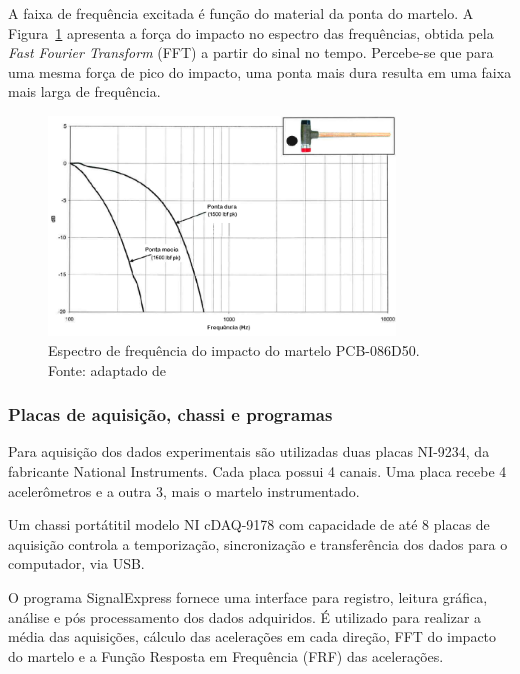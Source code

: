 A faixa de frequência excitada é função do material da ponta do martelo.
A Figura~\ref{fig::carta_badwidth} apresenta a força do impacto no espectro das
frequências, obtida pela \textit{Fast Fourier Transform} (FFT) a partir do sinal
no tempo.
Percebe-se que para uma mesma força de pico do impacto, uma ponta mais dura
resulta em uma faixa mais larga de frequência.

\begin{figure}[h!]
	\centering 
 	\includegraphics[width=0.82\textwidth]{figs/carta_badwidth}
 	\caption[Espectro de frequência do impacto do martelo PCB-086D50]{Espectro de
 	frequência do impacto do martelo PCB-086D50. \\	Fonte: adaptado de~\cite{manualpcb} }
 	\label{fig::carta_badwidth}
\end{figure}


\subsubsection{Placas de aquisição, chassi e programas}

Para aquisição dos dados experimentais são utilizadas duas placas NI-9234, da
fabricante National Instruments. Cada placa possui 4 canais. Uma placa recebe 4
acelerômetros e a outra 3, mais o martelo instrumentado.

Um chassi portátitil modelo NI cDAQ-9178 com capacidade de até 8 placas
de aquisição controla a temporização, sincronização e transferência dos dados
para o computador, via USB. 

O programa SignalExpress fornece uma interface para registro, leitura gráfica,
análise e pós processamento dos dados adquiridos. É utilizado para realizar
a média das aquisições, cálculo das acelerações em cada direção, FFT do impacto
do martelo e a Função Resposta em Frequência (FRF) das acelerações.

